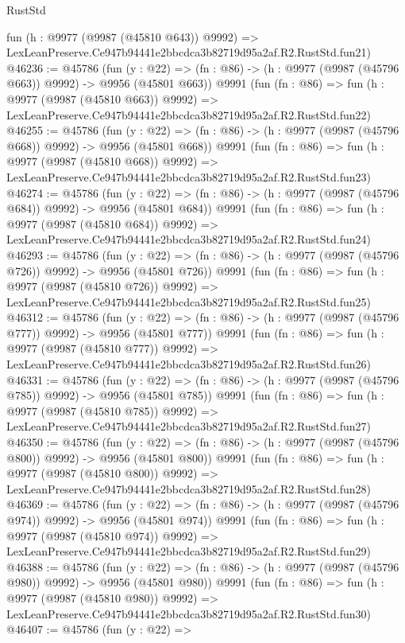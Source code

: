 \begin{lexlean}{RustStd}
\begin{coremodule}
    fun (h : @9977 (@9987 (@45810 @643)) @9992) =>
    LexLeanPreserve.Ce947b94441e2bbcdca3b82719d95a2af.R2.RustStd.fun21)
@46236 := @45786
    (fun (y : @22) => (fn : @86) -> (h : @9977 (@9987 (@45796 @663)) @9992) -> @9956 (@45801 @663))
    @9991
    (fun (fn : @86) =>
    fun (h : @9977 (@9987 (@45810 @663)) @9992) =>
    LexLeanPreserve.Ce947b94441e2bbcdca3b82719d95a2af.R2.RustStd.fun22)
@46255 := @45786
    (fun (y : @22) => (fn : @86) -> (h : @9977 (@9987 (@45796 @668)) @9992) -> @9956 (@45801 @668))
    @9991
    (fun (fn : @86) =>
    fun (h : @9977 (@9987 (@45810 @668)) @9992) =>
    LexLeanPreserve.Ce947b94441e2bbcdca3b82719d95a2af.R2.RustStd.fun23)
@46274 := @45786
    (fun (y : @22) => (fn : @86) -> (h : @9977 (@9987 (@45796 @684)) @9992) -> @9956 (@45801 @684))
    @9991
    (fun (fn : @86) =>
    fun (h : @9977 (@9987 (@45810 @684)) @9992) =>
    LexLeanPreserve.Ce947b94441e2bbcdca3b82719d95a2af.R2.RustStd.fun24)
@46293 := @45786
    (fun (y : @22) => (fn : @86) -> (h : @9977 (@9987 (@45796 @726)) @9992) -> @9956 (@45801 @726))
    @9991
    (fun (fn : @86) =>
    fun (h : @9977 (@9987 (@45810 @726)) @9992) =>
    LexLeanPreserve.Ce947b94441e2bbcdca3b82719d95a2af.R2.RustStd.fun25)
@46312 := @45786
    (fun (y : @22) => (fn : @86) -> (h : @9977 (@9987 (@45796 @777)) @9992) -> @9956 (@45801 @777))
    @9991
    (fun (fn : @86) =>
    fun (h : @9977 (@9987 (@45810 @777)) @9992) =>
    LexLeanPreserve.Ce947b94441e2bbcdca3b82719d95a2af.R2.RustStd.fun26)
@46331 := @45786
    (fun (y : @22) => (fn : @86) -> (h : @9977 (@9987 (@45796 @785)) @9992) -> @9956 (@45801 @785))
    @9991
    (fun (fn : @86) =>
    fun (h : @9977 (@9987 (@45810 @785)) @9992) =>
    LexLeanPreserve.Ce947b94441e2bbcdca3b82719d95a2af.R2.RustStd.fun27)
@46350 := @45786
    (fun (y : @22) => (fn : @86) -> (h : @9977 (@9987 (@45796 @800)) @9992) -> @9956 (@45801 @800))
    @9991
    (fun (fn : @86) =>
    fun (h : @9977 (@9987 (@45810 @800)) @9992) =>
    LexLeanPreserve.Ce947b94441e2bbcdca3b82719d95a2af.R2.RustStd.fun28)
@46369 := @45786
    (fun (y : @22) => (fn : @86) -> (h : @9977 (@9987 (@45796 @974)) @9992) -> @9956 (@45801 @974))
    @9991
    (fun (fn : @86) =>
    fun (h : @9977 (@9987 (@45810 @974)) @9992) =>
    LexLeanPreserve.Ce947b94441e2bbcdca3b82719d95a2af.R2.RustStd.fun29)
@46388 := @45786
    (fun (y : @22) => (fn : @86) -> (h : @9977 (@9987 (@45796 @980)) @9992) -> @9956 (@45801 @980))
    @9991
    (fun (fn : @86) =>
    fun (h : @9977 (@9987 (@45810 @980)) @9992) =>
    LexLeanPreserve.Ce947b94441e2bbcdca3b82719d95a2af.R2.RustStd.fun30)
@46407 := @45786
    (fun (y : @22) =>

\end{coremodule}
\end{lexlean}
